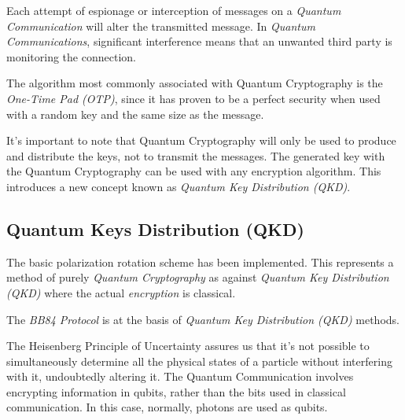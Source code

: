 \documentclass[conference]{IEEEtran}
\begin{document}
\vspace{4pt}

Each attempt of espionage or interception of messages on a \textit{Quantum Communication} will alter the transmitted message. In \textit{Quantum Communications}, significant interference means that an unwanted third party is monitoring the connection.

\vspace{4pt}

The algorithm most commonly associated with Quantum Cryptography is the \textit{One-Time Pad (OTP)}, since it has proven to be a perfect security when used with a random key and the same size as the message.

\vspace{4pt}

It's important to note that Quantum Cryptography will only be used to produce and distribute the keys, not to transmit the messages. The generated key with the Quantum Cryptography can be used with any encryption algorithm. This introduces a new concept known as \textit{Quantum Key Distribution (QKD)}.

\vspace{6pt}

\subsection{Quantum Keys Distribution (QKD)}

\vspace{4pt}


The basic polarization rotation scheme has been implemented. This represents a method of purely \textit{Quantum Cryptography} as against \textit{Quantum Key Distribution (QKD)} where the actual \textit{encryption} is classical.

\vspace{4pt}

The \textit{BB84 Protocol} is at the basis of \textit{Quantum Key Distribution (QKD)} methods. 
\vspace{4pt}

The Heisenberg Principle of Uncertainty assures us that it's not possible to simultaneously determine all the physical states of a particle without interfering with it, undoubtedly altering it. The Quantum Communication involves encrypting information in qubits, rather than the bits used in classical communication. In this case, normally, photons are used as qubits.

\vspace{4pt}
\end{document}
